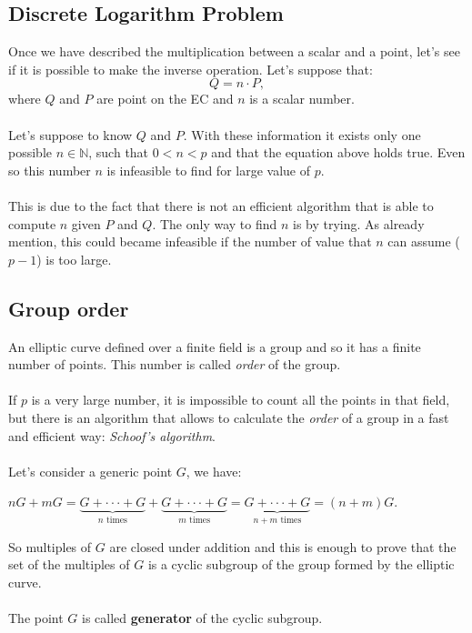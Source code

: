 \subsection{Discrete Logarithm Problem}
Once we have described the multiplication between a scalar and a point, let's see if it is possible to make the inverse operation. Let's suppose that:
\begin{equation*}
Q = n \cdot P,
\end{equation*}
where $Q$ and $P$ are point on the EC and $n$ is a scalar number. 
\\ \\ 
Let's suppose to know $Q$ and $P$. With these information it exists only one possible $n \in \mathbb{N}$, such that $0<n<p$ and that the equation above holds true. Even so this number $n$ is infeasible to find for large value of $p$.
\\ \\
This is due to the fact that there is not an efficient algorithm that is able to compute $n$ given $P$ and $Q$. The only way to find $n$ is by trying. As already mention, this could became infeasible if the number of value that $n$ can assume ($p-1$) is too large.

\subsection{Group order}
An elliptic curve defined over a finite field is a group and so it has a finite number of points. This number is called \textit{order} of the group.
\\ \\
If $p$ is a very large number, it is impossible to count all the points in that field, but there is an algorithm that allows to calculate the \textit{order} of a group in a fast and efficient way: \textit{Schoof's algorithm}.
\\ \\
Let's consider a generic point $G$, we have:
\begin{center} 
	$ nG+mG=\underbrace{
		G+\cdot \cdot \cdot+G
	}_{n\text{ times}}+
	\underbrace{
		G+\cdot \cdot \cdot+G
	}_{m\text{ times}}=
	\underbrace{
		G+\cdot \cdot \cdot+G
	}_{n+m\text{ times}} = 
	(n+m)G$.
\end{center}
So multiples of $G$ are closed under addition and this is enough to prove that the set of the multiples of $G$ is a cyclic subgroup of the group formed by the elliptic curve.
\\ \\
The point $G$ is called \textbf{generator} of the cyclic subgroup.


